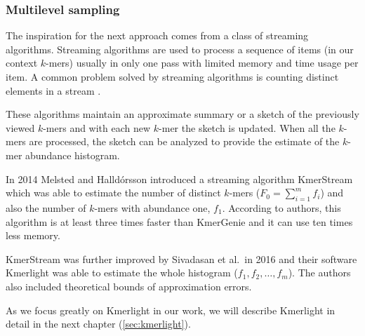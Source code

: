 \subsubsection{Multilevel sampling}
The inspiration for the next approach comes from a class of streaming algorithms.
Streaming algorithms are used to process a sequence of items (in our context $k$-mers) usually 
in only one pass with limited memory and time usage per item. A common problem solved by
streaming algorithms is counting distinct elements in a stream \cite{WikiStreamingAlg}.

These algorithms maintain an approximate summary or a sketch of the previously viewed
$k$-mers and with each new $k$-mer the sketch is updated. When all the $k$-mers are processed,
the sketch can be analyzed to provide the estimate of the $k$-mer abundance histogram.

\medskip

In 2014 Melsted and Halldórsson introduced a streaming algorithm KmerStream \cite{Melsted2014}
which was able to estimate the number of distinct $k$-mers ($F_0 = \sum_{i=1}^{m} f_i$) and also
the number of $k$-mers with abundance one, $f_1$. According to authors, this algorithm is
at least three times faster than KmerGenie and it can use ten times less memory.

KmerStream was further improved by Sivadasan et al.\ in 2016 \cite{Sivadasan2016}
and their software Kmerlight was able to estimate the whole histogram ($f_1, f_2, \dots , f_m$).
The authors also included theoretical bounds of approximation errors.

As we focus greatly on Kmerlight in our work, we will describe Kmerlight in detail 
in the next chapter (\ref{sec:kmerlight}).
